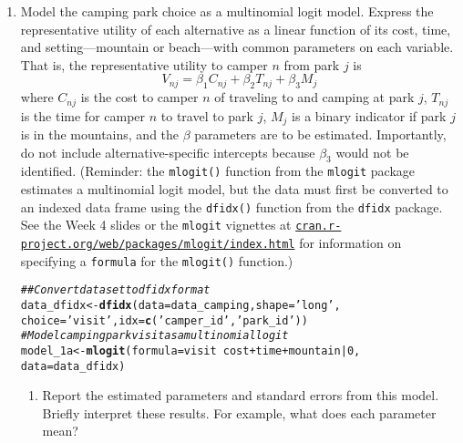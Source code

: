 \documentclass[11pt,letterpaper]{article}\usepackage[]{graphicx}\usepackage[]{xcolor}
\makeatletter
\newcommand{\hlnum}[1]{\textcolor[rgb]{0.686,0.059,0.569}{#1}}%
\newcommand{\hlstr}[1]{\textcolor[rgb]{0.192,0.494,0.8}{#1}}%
\newcommand{\hlcom}[1]{\textcolor[rgb]{0.678,0.584,0.686}{\textit{#1}}}%
\newcommand{\hlopt}[1]{\textcolor[rgb]{0,0,0}{#1}}%
\newcommand{\hlstd}[1]{\textcolor[rgb]{0.345,0.345,0.345}{#1}}%
\newcommand{\hlkwb}[1]{\textcolor[rgb]{0.69,0.353,0.396}{#1}}%
\newcommand{\hlkwc}[1]{\textcolor[rgb]{0.333,0.667,0.333}{#1}}%
\newcommand{\hlkwd}[1]{\textcolor[rgb]{0.737,0.353,0.396}{\textbf{#1}}}%
\newenvironment{kframe}{%
 \def\at@end@of@kframe{}%
 \ifinner\ifhmode%
  \def\at@end@of@kframe{\end{minipage}}%
  \begin{minipage}{\columnwidth}%
 \fi\fi%
 \def\FrameCommand##1{\hskip\@totalleftmargin \hskip-\fboxsep
 \colorbox{shadecolor}{##1}\hskip-\fboxsep
     \hskip-\linewidth \hskip-\@totalleftmargin \hskip\columnwidth}%
 \MakeFramed {\advance\hsize-\width
   \@totalleftmargin\z@ \linewidth\hsize
   \@setminipage}}%
 {\par\unskip\endMakeFramed%
 \at@end@of@kframe}
\newenvironment{knitrout}{}{} %
\makeatother
\begin{document}
\begin{enumerate}[label=\alph*., leftmargin=*]
	\item Model the camping park choice as a multinomial logit model. Express the representative utility of each alternative as a linear function of its cost, time, and setting---mountain or beach---with common parameters on each variable. That is, the representative utility to camper $n$ from park $j$ is
	$$V_{nj} = \beta_1 C_{nj} + \beta_2 T_{nj} + \beta_3 M_j$$
	where $C_{nj}$ is the cost to camper $n$ of traveling to and camping at park $j$, $T_{nj}$ is the time for camper $n$ to travel to park $j$, $M_j$ is a binary indicator if park $j$ is in the mountains, and the $\beta$ parameters are to be estimated. Importantly, do not include alternative-specific intercepts because $\beta_3$ would not be identified. (Reminder: the \texttt{mlogit()} function from the \texttt{mlogit} package estimates a multinomial logit model, but the data must first be converted to an indexed data frame using the \texttt{dfidx()} function from the \texttt{dfidx} package. See the Week 4 slides or the \texttt{mlogit} vignettes at \href{https://cran.r-project.org/web/packages/mlogit/index.html}{\texttt{cran.r-project.org/web/packages/mlogit/index.html}} for information on specifying a \texttt{formula} for the \texttt{mlogit()} function.)

\begin{knitrout}
\color{fgcolor}\begin{kframe}
\begin{alltt}
\hlcom{## Convert dataset to dfidx format}
\hlstd{data_dfidx} \hlkwb{<-} \hlkwd{dfidx}\hlstd{(}\hlkwc{data} \hlstd{= data_camping,} \hlkwc{shape} \hlstd{=} \hlstr{'long'}\hlstd{,}
                    \hlkwc{choice} \hlstd{=} \hlstr{'visit'}\hlstd{,} \hlkwc{idx} \hlstd{=} \hlkwd{c}\hlstd{(}\hlstr{'camper_id'}\hlstd{,} \hlstr{'park_id'}\hlstd{))}
\hlcom{# Model camping park visit as a multinomial logit}
\hlstd{model_1a} \hlkwb{<-} \hlkwd{mlogit}\hlstd{(}\hlkwc{formula} \hlstd{= visit} \hlopt{~} \hlstd{cost} \hlopt{+} \hlstd{time} \hlopt{+} \hlstd{mountain} \hlopt{|} \hlnum{0}\hlstd{,}
                   \hlkwc{data} \hlstd{= data_dfidx)}
\end{alltt}
\end{kframe}
\end{knitrout}

	\begin{enumerate}[label=\roman*.]
		\item Report the estimated parameters and standard errors from this model. Briefly interpret these results. For example, what does each parameter mean?


\end{enumerate}
\end{enumerate}
\end{document}
